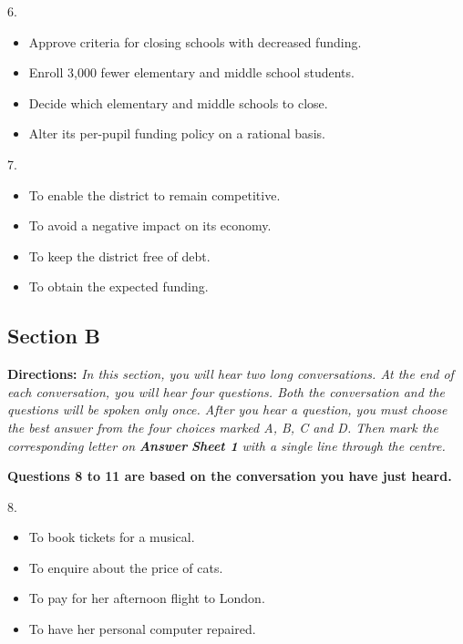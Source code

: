 \documentclass[UTF8,11pt]{ctexart}
\begin{document}
6.


\begin{itemize}[leftmargin=2em,itemsep=.2em,topsep=.4em]\item[A.] Approve criteria for closing schools with decreased funding.
\item[B.] Enroll 3,000 fewer elementary and middle school students.
\item[C.] Decide which elementary and middle schools to close.
\item[D.] Alter its per-pupil funding policy on a rational basis.
\end{itemize}

7.


\begin{itemize}[leftmargin=2em,itemsep=.2em,topsep=.4em]\item[A.] To enable the district to remain competitive.
\item[B.] To avoid a negative impact on its economy.
\item[C.] To keep the district free of debt.
\item[D.] To obtain the expected funding.
\end{itemize}

\subsection*{\textbf{Section B}}


\textbf{Directions:} \textit{In this section, you will hear two long conversations. At the end of each conversation, you will hear four} \textit{questions. Both the conversation and the questions will be spoken only once. After you hear a question, you must} \textit{choose the best answer from the four choices marked A, B, C and D. Then mark the corresponding letter on }\textbf{\textit{Answer}} \textbf{\textit{Sheet 1}}\textit{ with a single line through the centre.}


\textbf{Questions 8 to 11 are based on the conversation you have just heard.}


8.


\begin{itemize}[leftmargin=2em,itemsep=.2em,topsep=.4em]\item[A.] To book tickets for a musical.
\item[B.] To enquire about the price of cats.
\item[C.] To pay for her afternoon flight to London.
\item[D.] To have her personal computer repaired.
\end{itemize}
\end{document}
